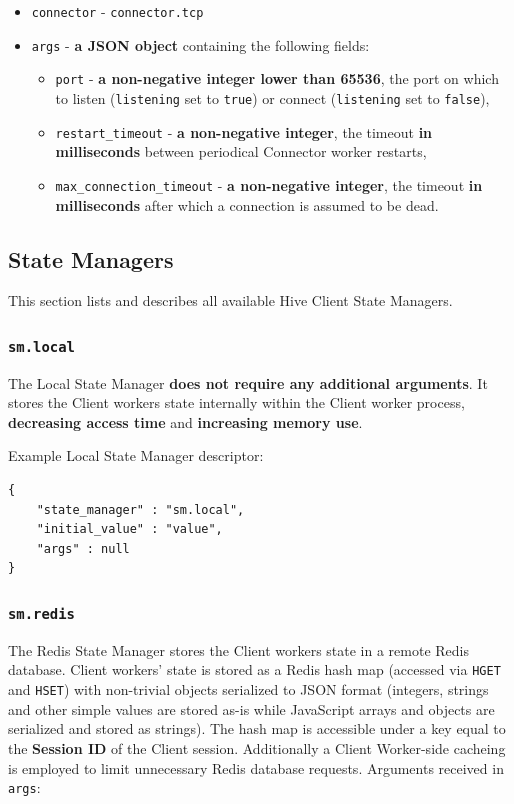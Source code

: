 \documentclass[a4paper]{article}
\begin{document}
\begin{itemize}
\item \texttt{connector} - \texttt{connector.tcp}
\item \texttt{args} - \textbf{a JSON object} containing the following fields:
\begin{itemize}
\item \texttt{port} - \textbf{a non-negative integer lower than 65536}, the port on which to listen (\texttt{listening} set to \texttt{true}) or connect (\texttt{listening} set to \texttt{false}),
\item \texttt{restart\_timeout} - \textbf{a non-negative integer}, the timeout \textbf{in milliseconds} between periodical Connector worker restarts,
\item \texttt{max\_connection\_timeout} - \textbf{a non-negative integer}, the timeout \textbf{in milliseconds} after which a connection is assumed to be dead.
\end{itemize}
\end{itemize}
\subsection{State Managers}
\label{sec-9-5}
\label{ref-state_managers}

This section lists and describes all available Hive Client State Managers.
\subsubsection{\texttt{sm.local}}
\label{sec-9-5-1}

The Local State Manager \textbf{does not require any additional arguments}. It stores the Client workers state internally within the Client worker process, \textbf{decreasing access time} and \textbf{increasing memory use}.

\noindent
Example Local State Manager descriptor:

\begin{verbatim}
{
    "state_manager" : "sm.local",
    "initial_value" : "value",
    "args" : null
}
\end{verbatim}
\subsubsection{\texttt{sm.redis}}
\label{sec-9-5-2}

The Redis State Manager stores the Client workers state in a remote Redis database. Client workers' state is stored as a Redis hash map (accessed via \texttt{HGET} and \texttt{HSET}) with non-trivial objects serialized to JSON format (integers, strings and other simple values are stored as-is while JavaScript arrays and objects are serialized and stored as strings). The hash map is accessible under a key equal to the \textbf{Session ID} of the Client session. Additionally a Client Worker-side cacheing is employed to limit unnecessary Redis database requests. Arguments received in \texttt{args}:
\end{document}
